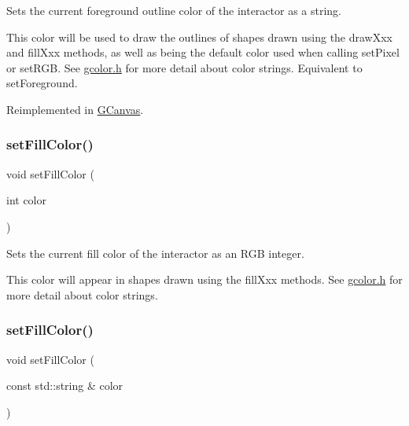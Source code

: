 Sets the current foreground outline color of the interactor as a string. 

This color will be used to draw the outlines of shapes drawn using the draw\+Xxx and fill\+Xxx methods, as well as being the default color used when calling set\+Pixel or set\+R\+GB. See \mbox{\hyperlink{gcolor_8h_source}{gcolor.\+h}} for more detail about color strings. Equivalent to set\+Foreground. 

Reimplemented in \mbox{\hyperlink{classGCanvas_a56845b1accc47aa881d05939eef6996c}{G\+Canvas}}.

\mbox{\label{classGDrawingSurface_a47fad447b715f2f303538434eed26709}} 
\subsubsection{\texorpdfstring{set\+Fill\+Color()}{setFillColor()}\hspace{0.1cm}{\footnotesize\ttfamily [1/2]}}
{\footnotesize\ttfamily void set\+Fill\+Color (\begin{DoxyParamCaption}\item[{int}]{color }\end{DoxyParamCaption})\hspace{0.3cm}{\ttfamily [virtual]}}



Sets the current fill color of the interactor as an R\+GB integer. 

This color will appear in shapes drawn using the fill\+Xxx methods. See \mbox{\hyperlink{gcolor_8h_source}{gcolor.\+h}} for more detail about color strings. \mbox{\label{classGDrawingSurface_adbc18b1a930aadd97d7437f9f7265b96}} 
\subsubsection{\texorpdfstring{set\+Fill\+Color()}{setFillColor()}\hspace{0.1cm}{\footnotesize\ttfamily [2/2]}}
{\footnotesize\ttfamily void set\+Fill\+Color (\begin{DoxyParamCaption}\item[{const std\+::string \&}]{color }\end{DoxyParamCaption})\hspace{0.3cm}{\ttfamily [virtual]}}



